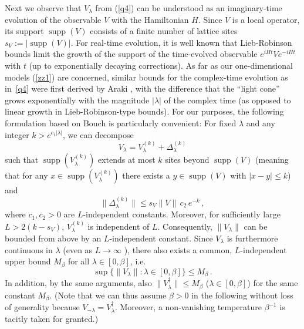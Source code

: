 \documentclass[twocolumn,aps,prb,floatfix,superscriptaddress]{revtex4-2}
\newcommand{\<}{\left\langle}	%
\renewcommand{\>}{\right\rangle}	%
\providecommand{\norm}[1]{\|#1\|}
\begin{document}
Next we observe that $V_\lambda$ from (\ref{q4})  can be understood 
as an imaginary-time evolution of the observable $V$ with the Hamiltonian $H$.
Since $V$ is a local operator, its support $\operatorname{supp}(V)$ consists 
of a finite number of lattice sites $s_V := \lvert \operatorname{supp}(V) \rvert$.
For real-time evolution,
it is well known that Lieb-Robinson bounds \cite{lie72, has10} limit the growth 
of the support of the time-evolved observable $e^{i H t} V e^{-i H t}$ with $t$ 
(up to exponentially decaying corrections).
As far as our one-dimensional models (\ref{zz1}) are concerned,
similar bounds for the complex-time evolution as in~\eqref{q4}
were first derived by Araki \cite{ara69},
with the difference that the ``light cone'' grows exponentially with the 
magnitude $\lvert \lambda \rvert$ of the complex time
(as opposed to linear growth in Lieb-Robinson-type bounds).
For our purposes, the following formulation based on Bouch \cite{bou15} is
particularly convenient:
For fixed $\lambda$ and any integer $k > e^{c_1 \lvert \lambda \rvert}$,
we can decompose
\begin{equation}
\label{eq:V:iTimeEvo:LocalDecomposition}
	V_\lambda = V_\lambda^{(k)} + \Delta_\lambda^{(k)}
\end{equation}
such that 
$\operatorname{supp}(V_\lambda^{(k)})$ extends at most $k$ sites beyond $\operatorname{supp}(V)$
(meaning that for any $x \in \operatorname{supp}(V_\lambda^{(k)})$ there exists 
a $y \in \operatorname{supp}(V)$ with $\lvert x - y \rvert \leq k$)
and
\begin{equation}
\label{eq:V:iTimeEvo:NonlocalBound}
	\norm{ \Delta_\lambda^{(k)} } \leq s_V \norm{V} \, c_2 \, e^{-k} \, ,
\end{equation}
where $c_1, c_2 > 0$ are $L$-independent constants.
Moreover, for sufficiently large $L > 2(k - s_V)$,
$V_\lambda^{(k)}$ is independent of $L$.
Consequently, $\norm{V_\lambda}$ can be bounded from above by an $L$-independent constant.
Since $V_\lambda$ is furthermore continuous in $\lambda$ (even as $L \to \infty$ \cite{bou15}),
there also exists a common, $L$-independent upper bound $M_\beta$ for all $\lambda \in [0, \beta]$,
i.e.
\begin{equation}
\label{eq:V:iTimeEvo:Bound}
	\sup \{ \norm{V_\lambda} : \lambda \in [0, \beta] \} \leq M_\beta \,.
\end{equation}
In addition, by the same arguments, also $\norm{V_\lambda^\dagger} \leq M_\beta$ 
($\lambda \in [0, \beta]$) for the same constant $M_\beta$.
(Note that we can thus assume $\beta > 0$ in the following without loss of 
generality because $V_{-\lambda} = V_\lambda^\dagger$.
Moreover,
a non-vanishing temperature $\beta^{-1}$ is tacitly taken for granted.)
\end{document}
